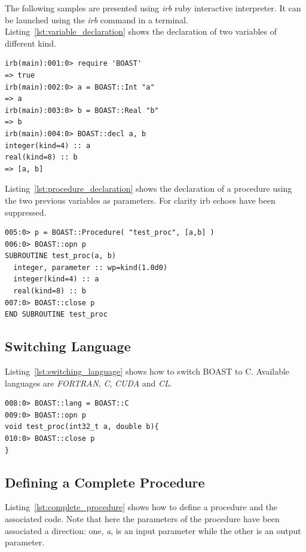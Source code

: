\documentclass[11pt, a4paper, twoside]{montblanc}
\begin{document}
The following samples are presented using \textit{irb} ruby interactive
interpreter. It can be launched using the \textit{irb} command in a terminal.
Listing~\ref{lst:variable_declaration} shows the declaration of two variables
of different kind.

\begin{lstlisting}
irb(main):001:0> require 'BOAST'
=> true
irb(main):002:0> a = BOAST::Int "a"
=> a
irb(main):003:0> b = BOAST::Real "b"
=> b
irb(main):004:0> BOAST::decl a, b
integer(kind=4) :: a
real(kind=8) :: b
=> [a, b]
\end{lstlisting}

Listing~\ref{lst:procedure_declaration} shows the declaration of a procedure
using the two previous variables as parameters. For clarity irb echoes have
been suppressed.

\begin{lstlisting}
005:0> p = BOAST::Procedure( "test_proc", [a,b] )
006:0> BOAST::opn p
SUBROUTINE test_proc(a, b)
  integer, parameter :: wp=kind(1.0d0)
  integer(kind=4) :: a
  real(kind=8) :: b
007:0> BOAST::close p
END SUBROUTINE test_proc
\end{lstlisting}

\subsection*{Switching Language}

Listing~\ref{lst:switching_language} shows how to switch BOAST to C. Available
languages are \textit{FORTRAN}, \textit{C}, \textit{CUDA} and \textit{CL}.

\begin{lstlisting}
008:0> BOAST::lang = BOAST::C
009:0> BOAST::opn p
void test_proc(int32_t a, double b){
010:0> BOAST::close p
}
\end{lstlisting}

\subsection*{Defining a Complete Procedure}

Listing~\ref{lst:complete_procedure} shows how to define a procedure and the
associated code. Note that here the parameters of the procedure have been
associated a direction: one, \textit{a}, is an input parameter while the other
is an output parameter.
\end{document}
